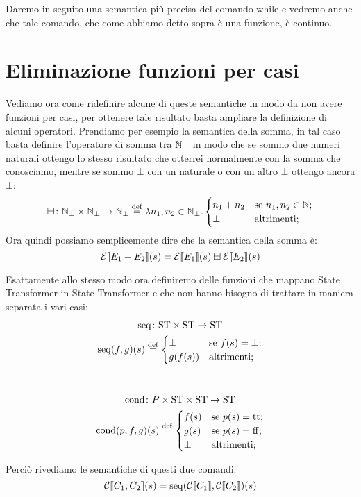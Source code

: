 Daremo in seguito una semantica più precisa del comando while e vedremo anche che tale comando, che come abbiamo detto sopra è una funzione, è continuo.

\section{Eliminazione funzioni per casi} 
Vediamo ora come ridefinire alcune di queste semantiche in modo da non avere funzioni per casi, per ottenere tale risultato basta ampliare la definizione di alcuni operatori. Prendiamo per esempio la semantica della somma, in tal caso basta definire l'operatore di somma tra $\mathbb{N}_\bot$ in modo che se sommo due numeri naturali ottengo lo stesso risultato che otterrei normalmente con la somma che conosciamo, mentre se sommo $\bot$ con un naturale o con un altro $\bot$ ottengo ancora $\bot$:
$$\fund{\conadd}{\Nset_\bot \times \Nset_\bot}{\Nset_\bot} \defeq \lambda n_1, n_2 \in \Nset_\bot . \begin{cases}
	n_1 + n_2 & \text{se } n_1, n_2 \in \Nset;\\
	\bot & \text{altrimenti;}
	\end{cases}$$
Ora quindi possiamo semplicemente dire che la semantica della somma è:
$$\mathcal{E} \llbracket E_1 + E_2 \rrbracket (s) = \mathcal{E} \llbracket E_1 \rrbracket (s) \mathbin{\boxplus} \mathcal{E} \llbracket E_2 \rrbracket (s)$$

Esattamente allo stesso modo ora definiremo delle funzioni che mappano State Transformer in State Transformer e che non hanno bisogno di trattare in maniera separata i vari casi:
\begin{gather*}
\fund{\mathrm{seq}}{\ST \times \ST}{\ST} \\
\mathrm{seq}(f,g)(s) \defeq \begin{cases}
	\bot & \text{se } f(s) = \bot;\\
	g(f(s)) & \text{altrimenti};
	\end{cases}\\
\pts
\fund{\mathrm{cond}}{P \times \ST \times \ST}{\ST} \\
\mathrm{cond}(p,f,g)(s) \defeq \begin{cases}
	f(s) & \text{se } p(s) = \ttv;\\
	g(s) & \text{se } p(s) = \ffv;\\
	\bot & \text{altrimenti};
	\end{cases}\\
\end{gather*}

Perciò rivediamo le semantiche di questi due comandi:
$$ \mathcal{C} \llbracket C_1 ; C_2 \rrbracket (s) = \mathrm{seq}(\mathcal{C} \llbracket C_1 \rrbracket, \mathcal{C} \llbracket C_2 \rrbracket)(s)$$

